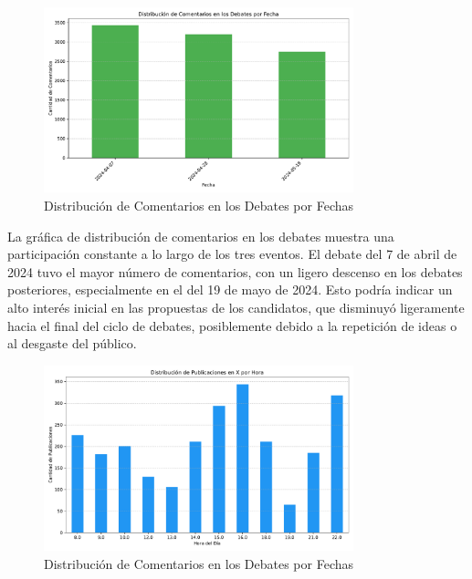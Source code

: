 \documentclass[10pt, a4paper]{article}
\begin{document}
	\begin{figure}[h!]
		\centering
		\includegraphics[width=0.8\textwidth]{comentarios_fecha.pdf} %
		\vspace{-3mm}
		\caption{Distribución de Comentarios en los Debates por Fechas}
		\label{fig:temporalDebates} %
	\end{figure}
	
	La gráfica de distribución de comentarios en los debates muestra una participación constante a lo largo de los tres eventos. El debate del 7 de abril de 2024 tuvo el mayor número de comentarios, con un ligero descenso en los debates posteriores, especialmente en el del 19 de mayo de 2024. Esto podría indicar un alto interés inicial en las propuestas de los candidatos, que disminuyó ligeramente hacia el final del ciclo de debates, posiblemente debido a la repetición de ideas o al desgaste del público.
	
	\begin{figure}[h!]
		\centering
		\includegraphics[width=0.8\textwidth]{publicaciones_por_hora.pdf} %
		\vspace{-3mm}
		\caption{Distribución de Comentarios en los Debates por Fechas}
		\label{fig:temporalDiaEleccion} %
	\end{figure}
	
\end{document}
